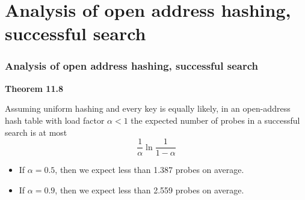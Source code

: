 \documentclass{beamer}
\newcommand{\bi}{\begin{itemize}}
\newcommand{\ii}{\item}
\newcommand{\ei}{\end{itemize}}
\newcommand{\sect}[1]{
\section{#1}
\begin{frame}[fragile]\frametitle{#1}
}
\begin{document}
\sect{Analysis of open address hashing, successful search}

{\bf Theorem 11.8}

Assuming uniform hashing and every key is equally likely,
in an open-address hash table with load factor $\alpha < 1$
the expected number of probes in a successful search is at most
\[
\frac{1}{\alpha}\ln\frac{1}{1-\alpha}
\]

\bi
\ii If $\alpha = 0.5$, then we expect less than 1.387 probes on
average.
\ii If $\alpha = 0.9$, then we expect less than 2.559 probes on
average. 
\ei

\end{frame}


\end{document}
